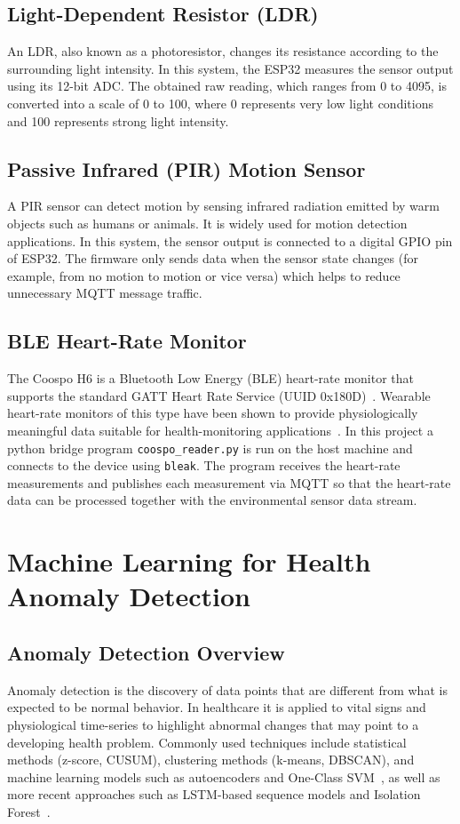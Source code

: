 \subsection{Light-Dependent Resistor (LDR)}

An LDR, also known as a photoresistor, changes its resistance according to the surrounding light intensity. In this system, the ESP32 measures the sensor output using its 12-bit ADC. The obtained raw reading, which ranges from 0 to 4095, is converted into a scale of 0 to 100, where 0 represents very low light conditions and 100 represents strong light intensity.
\subsection{Passive Infrared (PIR) Motion Sensor}

A PIR sensor can detect motion by sensing infrared radiation emitted by warm objects such as humans or animals. It is widely used for motion detection applications. In this system, the sensor output is connected to a digital GPIO pin of ESP32. The firmware only sends data when the sensor state changes (for example, from no motion to motion or vice versa) which helps to reduce unnecessary MQTT message traffic.

\subsection{BLE Heart-Rate Monitor}
The Coospo H6 is a Bluetooth Low Energy (BLE) heart-rate monitor that supports the standard GATT Heart Rate Service (UUID 0x180D)~\cite{BluetoothSIG2011}. Wearable heart-rate monitors of this type have been shown to provide physiologically meaningful data suitable for health-monitoring applications~\cite{Pantelopoulos2010}. In this project a python bridge program \verb|coospo_reader.py| is run on the host machine and connects to the device using \texttt{bleak}. The program receives the heart-rate measurements and publishes each measurement via MQTT so that the heart-rate data can be processed together with the environmental sensor data stream.

\section{Machine Learning for Health Anomaly Detection}

\subsection{Anomaly Detection Overview}
Anomaly detection is the discovery of data points that are different from what is expected to be normal behavior. In healthcare it is applied to vital signs and physiological time-series to highlight abnormal changes that may point to a developing health problem.
Commonly used techniques include statistical methods (z-score, CUSUM), clustering methods (k-means, DBSCAN), and machine learning models such as autoencoders and One-Class SVM~\cite{Chandola2009}, as well as more recent approaches such as LSTM-based sequence models and Isolation Forest~\cite{Liu2008}.

